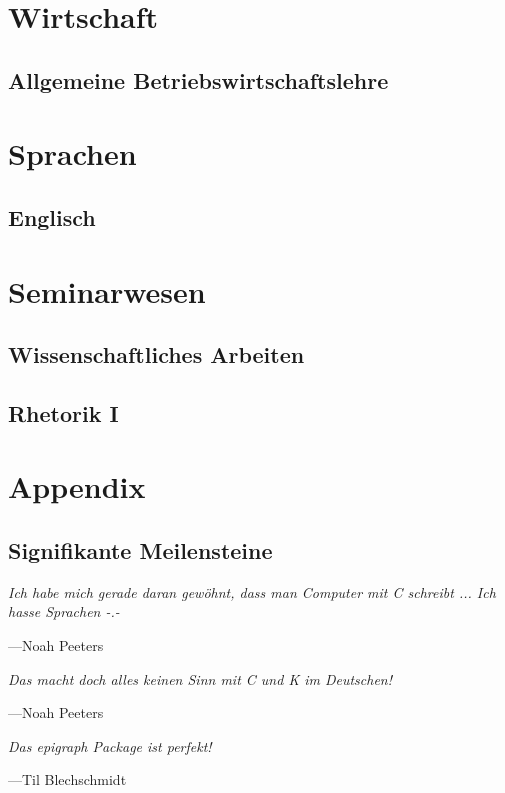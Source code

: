 \documentclass[a4paper]{report}
\begin{document}
    \part{Wirtschaft}
        \chapter{Allgemeine Betriebswirtschaftslehre}
            
	        
    \part{Sprachen}
        \chapter{Englisch}
            
	        
    \part{Seminarwesen}
        \chapter{Wissenschaftliches Arbeiten}
            
        \chapter{Rhetorik I}
            

    
    \clearpage
    \part{Appendix}
    
    	\clearpage
    	\printglossary[type=\acronymtype]
        \printglossary
        
        \clearpage
        
        
        
        \listoffigures
        
        \clearpage
        \chapter{Signifikante Meilensteine}
        
            \epigraph{\itshape Ich habe mich gerade daran gewöhnt, dass man Computer mit C schreibt ... Ich hasse Sprachen -.-}{---Noah Peeters}
            
            \epigraph{\itshape Das macht doch alles keinen Sinn mit C und K im Deutschen!}{---Noah Peeters}
            
            \epigraph{\itshape Das epigraph Package ist perfekt!}{---Til Blechschmidt}
            
\end{document}
